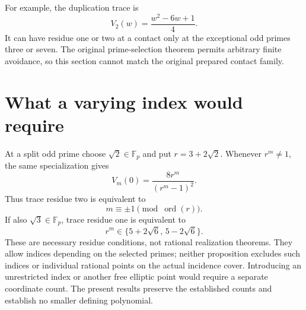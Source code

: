 \documentclass[11pt,a4paper]{article}
\begin{document}
For example, the duplication trace is
\[
                  V_2(w)=\frac{w^2-6w+1}{4}.
\]
It can have residue one or two at a contact only at the exceptional
odd primes three or seven. The original prime-selection theorem
permits arbitrary finite avoidance, so this section cannot match
the original prepared contact family.

\section{What a varying index would require}
At a split odd prime choose $\sqrt2\in\mathbb F_p$ and put
$r=3+2\sqrt2$. Whenever $r^m\ne1$, the same specialization gives
\[
 V_m(0)=\frac{8r^m}{(r^m-1)^2}.
\]
Thus trace residue two is equivalent to
\[
                    m\equiv\pm1\pmod{\operatorname{ord}(r)}.
\]
If also $\sqrt3\in\mathbb F_p$, trace residue one is equivalent to
\[
               r^m\in\{5+2\sqrt6,\,5-2\sqrt6\}.
\]
These are necessary residue conditions, not rational realization
theorems. They allow indices depending on the selected primes;
neither proposition excludes such indices or individual rational
points on the actual incidence cover. Introducing an unrestricted
index or another free elliptic point would require a separate
coordinate count. The present results preserve the established
counts and establish no smaller defining polynomial.
\end{document}
